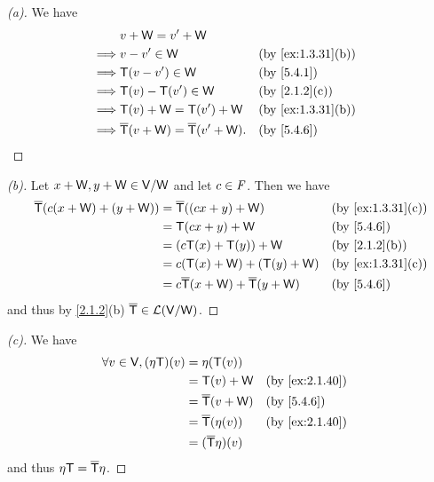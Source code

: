 \begin{proof}[(a)]
  We have
  \begin{align*}
             & v + \W = v' + \W                                                                     \\
    \implies & v - v' \in \W                                   &  & \text{(by \cref{ex:1.3.31}(b))} \\
    \implies & \T(v - v') \in \W                               &  & \text{(by \cref{5.4.1})}        \\
    \implies & \T(v) - \T(v') \in \W                           &  & \text{(by \cref{2.1.2}(c))}     \\
    \implies & \T(v) + \W = \T(v') + \W                        &  & \text{(by \cref{ex:1.3.31}(b))} \\
    \implies & \overline{\T}(v + \W) = \overline{\T}(v' + \W). &  & \text{(by \cref{5.4.6})}
  \end{align*}
\end{proof}

\begin{proof}[(b)]
  Let \(x + \mathsf{W}, y + \mathsf{W} \in \mathsf{V} / \mathsf{W}\) and let \(c \in \mathit{F}\).
  Then we have
  \begin{align*}
    \overline{\T}(c(x + \W) + (y + \W)) & = \overline{\T}((cx + y) + \W)                    &  & \text{(by \cref{ex:1.3.31}(c))} \\
                                        & = \T(cx + y) + \W                                 &  & \text{(by \cref{5.4.6})}        \\
                                        & = (c \T(x) + \T(y)) + \W                          &  & \text{(by \cref{2.1.2}(b))}     \\
                                        & = c (\T(x) + \W) + (\T(y) + \W)                   &  & \text{(by \cref{ex:1.3.31}(c))} \\
                                        & = c \overline{\T}(x + \W) + \overline{\T}(y + \W) &  & \text{(by \cref{5.4.6})}
  \end{align*}
  and thus by \cref{2.1.2}(b) \(\overline{\mathsf{T}} \in \mathcal{L}(\mathsf{V} / \mathsf{W})\).
\end{proof}

\begin{proof}[(c)]
  We have
  \begin{align*}
    \forall v \in \V, (\eta \T)(v) & = \eta(\T(v))                                               \\
                                   & = \T(v) + \W              &  & \text{(by \cref{ex:2.1.40})} \\
                                   & = \overline{\T}(v + \W)   &  & \text{(by \cref{5.4.6})}     \\
                                   & = \overline{\T}(\eta(v))  &  & \text{(by \cref{ex:2.1.40})} \\
                                   & = (\overline{\T} \eta)(v)
  \end{align*}
  and thus \(\eta \mathsf{T} = \overline{\mathsf{T}} \eta\).
\end{proof}

